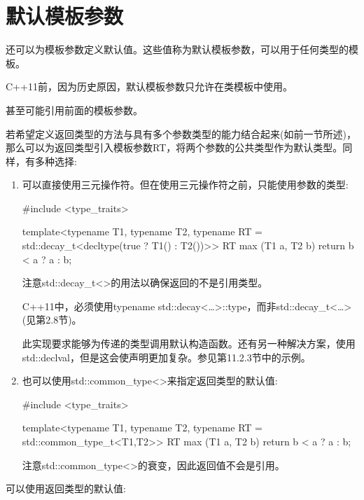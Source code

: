 \section{默认模板参数}

还可以为模板参数定义默认值。这些值称为默认模板参数，可以用于任何类型的模板。

\begin{notice}C++11前，因为历史原因，默认模板参数只允许在类模板中使用。
\end{notice}

甚至可能引用前面的模板参数。

若希望定义返回类型的方法与具有多个参数类型的能力结合起来(如前一节所述)，那么可以为返回类型引入模板参数RT，将两个参数的公共类型作为默认类型。同样，有多种选择:

\begin{enumerate}
\item 
可以直接使用三元操作符。但在使用三元操作符之前，只能使用参数的类型:

\begin{cpp}
#include <type_traits>

template<typename T1, typename T2,
typename RT = std::decay_t<decltype(true ? T1() : T2())>>
RT max (T1 a, T2 b)
{
	return b < a ? a : b;
}
\end{cpp}

注意std::decay\_t<>的用法以确保返回的不是引用类型。

\begin{notice}C++11中，必须使用typename std::decay<…>::type，而非std::decay\_t<…>(见第2.8节)。
\end{notice}

此实现要求能够为传递的类型调用默认构造函数。还有另一种解决方案，使用std::declval，但是这会使声明更加复杂。参见第11.2.3节中的示例。

\item
也可以使用std::common\_type<>来指定返回类型的默认值:

\begin{cpp}
#include <type_traits>

template<typename T1, typename T2,
typename RT = std::common_type_t<T1,T2>>
RT max (T1 a, T2 b)
{
	return b < a ? a : b;
}
\end{cpp}

注意std::common\_type<>的衰变，因此返回值不会是引用。
\end{enumerate}

可以使用返回类型的默认值:

